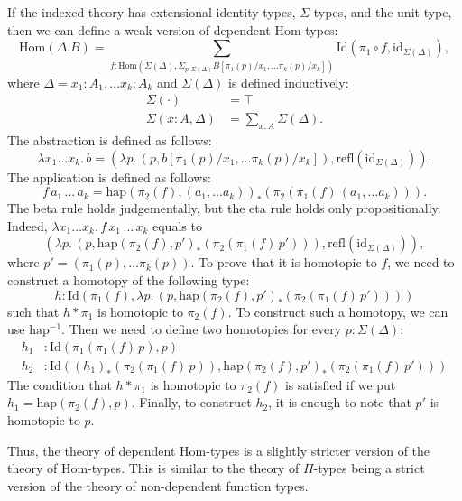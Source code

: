 \documentclass[reqno]{amsart}
\theoremstyle{definition}
\theoremstyle{remark}
\newcommand{\fs}[1]{\mathrm{#1}}
\newcommand{\Hom}{\fs{Hom}}
\newcommand{\Id}{\fs{Id}}
\newcommand{\refl}{\fs{refl}}
\newcommand{\id}{\fs{id}}
\numberwithin{figure}{section}
\begin{document}
If the indexed theory has extensional identity types, $\Sigma$-types, and the unit type, then we can define a weak version of dependent $\Hom$-types:
\[ \Hom(\Delta.B) = \sum_{f : \Hom(\Sigma(\Delta),\Sigma_{p : \Sigma(\Delta)} B[\pi_1(p)/x_1, \ldots \pi_k(p)/x_k])} \Id(\pi_1 \circ f, \id_{\Sigma(\Delta)}), \]
where $\Delta = x_1 : A_1, \ldots x_k : A_k$ and $\Sigma(\Delta)$ is defined inductively:
\begin{align*}
\Sigma(\cdot) & = \top \\
\Sigma(x : A, \Delta) & = \sum_{x : A} \Sigma(\Delta).
\end{align*}
The abstraction is defined as follows:
\[ \lambda x_1 \ldots x_k.\,b = (\lambda p.\,(p, b[\pi_1(p)/x_1, \ldots \pi_k(p)/x_k]), \refl(\id_{\Sigma(\Delta)})). \]
The application is defined as follows:
\[ f\,a_1\,\ldots\,a_k = \fs{hap}(\pi_2(f),(a_1, \ldots a_k))_*(\pi_2(\pi_1(f)\,(a_1, \ldots a_k))). \]
The beta rule holds judgementally, but the eta rule holds only propositionally.
Indeed, $\lambda x_1 \ldots x_k.\,f\,x_1\,\ldots\,x_k$ equals to
\[ (\lambda p.\,(p,\fs{hap}(\pi_2(f),p')_*(\pi_2(\pi_1(f)\,p'))), \refl(\id_{\Sigma(\Delta)})), \]
where $p' = (\pi_1(p), \ldots \pi_k(p))$.
To prove that it is homotopic to $f$, we need to construct a homotopy of the following type:
\[ h : \Id(\pi_1(f), \lambda p.\,(p,\fs{hap}(\pi_2(f),p')_*(\pi_2(\pi_1(f)\,p')))) \]
such that $h * \pi_1$ is homotopic to $\pi_2(f)$.
To construct such a homotopy, we can use $\fs{hap^{-1}}$.
Then we need to define two homotopies for every $p : \Sigma(\Delta)$:
\begin{align*}
h_1 & : \Id(\pi_1(\pi_1(f)\,p),p) \\
h_2 & : \Id((h_1)_*(\pi_2(\pi_1(f)\,p)),\fs{hap}(\pi_2(f),p')_*(\pi_2(\pi_1(f)\,p')))
\end{align*}
The condition that $h * \pi_1$ is homotopic to $\pi_2(f)$ is satisfied if we put $h_1 = \fs{hap}(\pi_2(f),p)$.
Finally, to construct $h_2$, it is enough to note that $p'$ is homotopic to $p$.

Thus, the theory of dependent $\Hom$-types is a slightly stricter version of the theory of $\Hom$-types.
This is similar to the theory of $\Pi$-types being a strict version of the theory of non-dependent function types.
\end{document}
